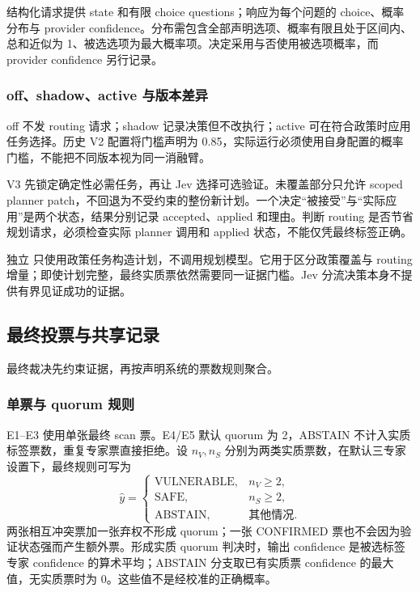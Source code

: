 结构化请求提供 state 和有限 choice questions；响应为每个问题的 choice、概率分布与 provider confidence。分布需包含全部声明选项、概率有限且处于区间内、总和近似为 1、被选选项为最大概率项。决定采用与否使用被选项概率，而 provider confidence 另行记录。

\subsubsection{off、shadow、active 与版本差异}
off 不发 routing 请求；shadow 记录决策但不改执行；active 可在符合政策时应用任务选择。历史 V2 配置将门槛声明为 0.85，实际运行必须使用自身配置的概率门槛，不能把不同版本视为同一消融臂。

V3 先锁定确定性必需任务，再让 Jev 选择可选验证。未覆盖部分只允许 scoped planner patch，不回退为不受约束的整份新计划。一个决定“被接受”与“实际应用”是两个状态，结果分别记录 accepted、applied 和理由。判断 routing 是否节省规划请求，必须检查实际 planner 调用和 applied 状态，不能仅凭最终标签正确。

独立  只使用政策任务构造计划，不调用规划模型。它用于区分政策覆盖与 routing 增量；即使计划完整，最终实质票依然需要同一证据门槛。Jev 分流决策本身不提供有界见证成功的证据。

\subsection{最终投票与共享记录}
最终裁决先约束证据，再按声明系统的票数规则聚合。
\subsubsection{单票与 quorum 规则}
E1--E3 使用单张最终 scan 票。E4/E5 默认 quorum 为 2，ABSTAIN 不计入实质标签票数，重复专家票直接拒绝。设 $n_V,n_S$ 分别为两类实质票数，在默认三专家设置下，最终规则可写为
\begin{equation}
\hat y=\begin{cases}
\mathrm{VULNERABLE}, & n_V\ge 2,\\
\mathrm{SAFE}, & n_S\ge 2,\\
\mathrm{ABSTAIN}, & \text{其他情况}.
\end{cases}
\end{equation}
两张相互冲突票加一张弃权不形成 quorum；一张 CONFIRMED 票也不会因为验证状态强而产生额外票。形成实质 quorum 判决时，输出 confidence 是被选标签专家 confidence 的算术平均；ABSTAIN 分支取已有实质票 confidence 的最大值，无实质票时为 0。这些值不是经校准的正确概率。

